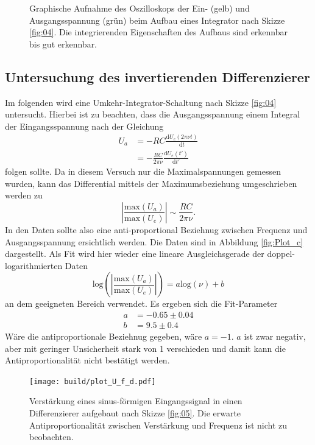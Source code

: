 \begin{figure}
\begin{subfigure}{0.35\textwidth}
  \end{subfigure}
  \caption{Graphische Aufnahme des Oszilloskops der Ein- (gelb) und Ausgangsspannung (grün) beim Aufbau eines Integrator nach Skizze \ref{fig:04}. Die integrierenden Eigenschaften des Aufbaus sind erkennbar bis gut erkennbar.}
  \label{fig:Osz_c}
\end{figure}
\FloatBarrier
\subsection{Untersuchung des invertierenden Differenzierer}
Im folgenden wird eine Umkehr-Integrator-Schaltung nach Skizze \ref{fig:04} untersucht. Hierbei ist zu beachten, dass die Ausgangsspannung einem Integral der Eingangsspannung nach der Gleichung
\begin{align}
  U_a &= -RC\frac{\text{d}U_e(2\pi \nu t)}{\text{d}t}\\
      &= -\frac{RC}{2\pi\nu} \frac{\text{d}U_e(t')}{\text{d}t'}
\end{align}
folgen sollte. Da in diesem Versuch nur die Maximalspannungen gemessen wurden, kann das Differential mittels der Maximumsbeziehung umgeschrieben werden zu
\begin{equation}
  \left|\frac{\text{max}\left(U_a\right)}{\text{max}\left(U_e\right)}\right| \sim \frac{RC}{2\pi\nu}.
\end{equation}
In den Daten sollte also eine anti-proportional Beziehnug zwischen Frequenz und Ausgangsspannung ersichtlich werden. Die Daten sind in Abbildung \ref{fig:Plot_c} dargestellt. Als Fit wird hier wieder eine lineare Ausgleichsgerade der doppel-logarithmierten Daten
\begin{equation}
  \text{log}\left(\left|\frac{\text{max}\left(U_a\right)}{\text{max}\left(U_e\right)}\right|\right) = a\text{log}\left(\nu \right)+b
\end{equation}
an dem geeigneten Bereich verwendet. Es ergeben sich die Fit-Parameter
\begin{align}
  a &= -0.65\pm 0.04\\
  b &= 9.5\pm 0.4
\end{align}
Wäre die antiproportionale Beziehnug gegeben, wäre $a=-1$. $a$ ist zwar negativ, aber mit geringer Unsicherheit stark von 1 verschieden und damit kann die Antiproportionalität nicht bestätigt werden.
\FloatBarrier
\begin{figure}
  \centering
  \texttt{[image: build/plot\_U\_f\_d.pdf]}
  \caption{Verstärkung eines sinus-förmigen Eingangssignal in einen Differenzierer aufgebaut nach Skizze \ref{fig:05}. Die erwarte Antiproportionalität zwischen Verstärkung und Frequenz ist nicht zu beobachten.}
  \label{fig:Plot_d}
\end{figure}
